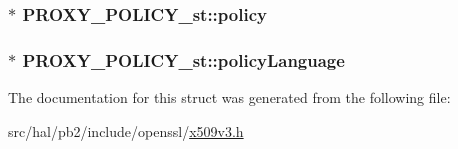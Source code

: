 \subsubsection[{\texorpdfstring{policy}{policy}}]{$\ast$ P\+R\+O\+X\+Y\+\_\+\+P\+O\+L\+I\+C\+Y\+\_\+st\+::policy}\hypertarget{struct_p_r_o_x_y___p_o_l_i_c_y__st_ac3360dfde3677ca63163277535db0dc2}{}\label{struct_p_r_o_x_y___p_o_l_i_c_y__st_ac3360dfde3677ca63163277535db0dc2}
\subsubsection[{\texorpdfstring{policy\+Language}{policyLanguage}}]{$\ast$ P\+R\+O\+X\+Y\+\_\+\+P\+O\+L\+I\+C\+Y\+\_\+st\+::policy\+Language}\hypertarget{struct_p_r_o_x_y___p_o_l_i_c_y__st_ab3fa64c1bd1d75d3433ec2c57ad2c764}{}\label{struct_p_r_o_x_y___p_o_l_i_c_y__st_ab3fa64c1bd1d75d3433ec2c57ad2c764}


The documentation for this struct was generated from the following file\+:\begin{DoxyCompactItemize}
\item 
src/hal/pb2/include/openssl/\hyperlink{x509v3_8h}{x509v3.\+h}\end{DoxyCompactItemize}
